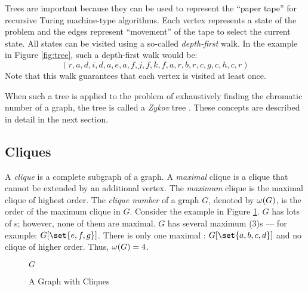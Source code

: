 Trees are important because they can be used to represent the ``paper tape'' for recursive Turing machine-type
algorithms.  Each vertex represents a state of the problem and the edges represent ``movement'' of the tape to
select the current state.  All states can be visited using a so-called \emph{depth-first} walk.  In the example
in Figure \ref{fig:tree}, such a depth-first walk would be:
\[(r,a,d,i,d,a,e,a,f,j,f,k,f,a,r,b,r,c,g,c,h,c,r)\]
Note that this walk guarantees that each vertex is visited at least once.

When such a tree is applied to the problem of exhaustively finding the chromatic number of a graph, the tree is
called a \emph{Zykov} tree \cite{mcdiarmid,zykov}.  These concepts are described in detail in the next section.

\subsection{Cliques}

A \emph{clique} is a complete subgraph of a graph.  A \emph{maximal} clique is a clique that cannot be extended by
an additional vertex.  The \emph{maximum} clique is the maximal clique of highest order.  The \emph{clique number}
of a graph \(G\), denoted by \(\omega(G)\), is the order of the maximum clique in \(G\).  Consider the example in
Figure \ref{fig:clique}.  \(G\) has lots of s; however, none of them are maximal.  \(G\) has several
maximum \clique(3)s --- for example: \(G[\set{e,f,g}]\).  There is only one maximal :
\(G[\set{a,b,c,d}]\) and no clique of higher order.  Thus, \(\omega(G)=4\).

\begin{figure}[h]
  \label{fig:clique}
  \begin{center}

    \bigskip

    \(G\)
  \end{center}
  \caption{A Graph with Cliques}
\end{figure}

